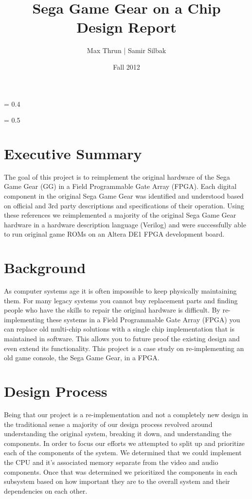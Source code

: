 \documentclass{article}
\title{
    \vspace{2in}
    \textbf{Sega Game Gear on a Chip}\\
    Design Report
    \vspace{3in}
}
\author{ Max Thrun | Samir Silbak}
\date{Fall 2012}
\begin{document}
\maketitle

\newpage
\parskip = 0.4\baselineskip
\tableofcontents

\parskip = 0.5\baselineskip

\newpage

\section{Executive Summary}

The goal of this project is to reimplement the original hardware of the Sega Game
Gear (GG) in a Field Programmable Gate Array (FPGA). Each digital component in
the original Sega Game Gear was identified and understood based on official
and 3rd party descriptions and specifications of their operation. Using these
references we reimplemented a majority of the original Sega Game Gear hardware in
a hardware description language (Verilog) and were successfully able to run original
game ROMs on an Altera DE1 FPGA development board.

\section{Background}

As computer systems age it is often impossible to keep physically maintaining
them.  For many legacy systems you cannot buy replacement parts and finding
people who have the skills to repair the original hardware is difficult. By
re-implementing these systems in a Field Programmable Gate Array (FPGA) you can
replace old multi-chip solutions with a single chip implementation that is
maintained in software. This allows you to future proof the existing design and
even extend its functionality. This project is a case study on re-implementing
an old game console, the Sega Game Gear, in a FPGA.

\section{Design Process}

Being that our project is a re-implementation and not a completely new design
in the traditional sense a majority of our design process revolved around
understanding the original system, breaking it down, and understanding the
components. In order to focus our efforts we attempted to split up and
prioritize each of the components of the system. We determined that we could
implement the CPU and it's associated memory separate from the video and audio
components. Once that was determined we prioritized the components in each
subsystem based on how important they are to the overall system and their
dependencies on each other.
\end{document}
